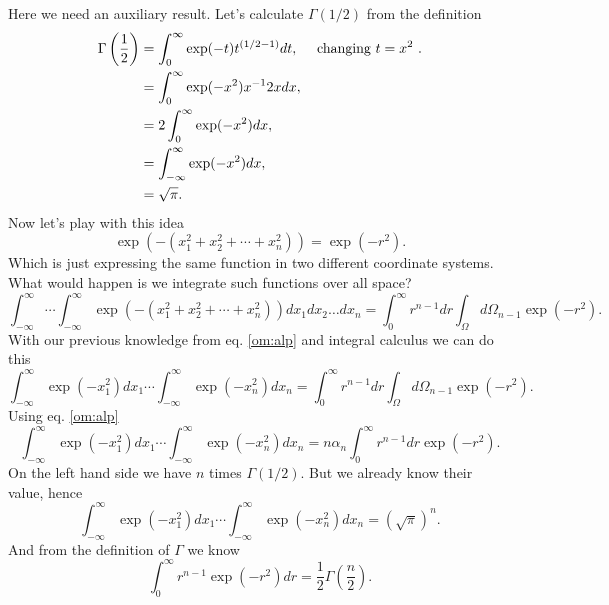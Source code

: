 \begin{questions}
\begin{solution}
  Here we need an auxiliary result. Let's calculate $\Gamma(1/2)$ from the definition
  \begin{equation}
    \begin{aligned}[b]
      \Gamma \left(\frac{1}{2} \right) &= \int_0^\infty \exp(-t)t^{(1/2 - 1)}dt, \quad\textnormal{  changing $t = x^2$ }.\\
      &= \int_0^\infty \exp(-x^2)x^{-1} 2xdx,\\
      &= 2 \int_0^\infty \exp(-x^2)dx, \\
      & =\int_{-\infty}^\infty \exp(-x^2)dx,\\
      & = \sqrt{\pi}.
    \end{aligned}
  \end{equation}
  Now let's play with this idea
  \begin{equation}
    \exp(-(x_1^2 +x_2^2 + \cdots + x_n^2)) = \exp{(-r^2)}.
    \label{exp:radial}
  \end{equation}
  Which is just expressing the same function in two different coordinate systems. What would happen is we integrate such functions over all space?
  \begin{equation}
    \int_{-\infty}^\infty \cdots \int_{-\infty}^\infty \exp(-(x_1^2 +x_2^2 + \cdots + x_n^2)) dx_1dx_2\ldots dx_n = \int_{0}^\infty r^{n-1}dr \int_\Omega d\Omega_{n-1} \exp{(-r^2)}.
  \end{equation}
  With our previous knowledge from eq. \ref{om:alp} and integral calculus we can do this
  \begin{equation}
    \int_{-\infty}^\infty \exp{(-x_1^2)}dx_1\cdots \int_{-\infty}^\infty \exp{(-x_n^2)}dx_n = \int_{0}^\infty r^{n-1}dr \int_\Omega d\Omega_{n-1} \exp{(-r^2)}.
  \end{equation}
  Using eq. \ref{om:alp}
  \begin{equation}
    \int_{-\infty}^\infty \exp{(-x_1^2)}dx_1\cdots \int_{-\infty}^\infty \exp{(-x_n^2)}dx_n = n\alpha_n\int_{0}^\infty r^{n-1}dr \exp{(-r^2)}.
  \end{equation}
  On the left hand side we have $n$ times $\Gamma(1/2)$. But we already know their value, hence
  \begin{equation}
    \int_{-\infty}^\infty \exp{(-x_1^2)}dx_1\cdots \int_{-\infty}^\infty \exp{(-x_n^2)}dx_n = (\sqrt{\pi})^n.
  \end{equation}
  And from the definition of $\Gamma$ we know
  \begin{equation}
    \int_0^\infty r^{n-1}\exp{(-r^2)} dr = \frac{1}{2} \Gamma \left(\frac{n}{2}\right).

\end{equation}
\end{solution}
\end{questions}
